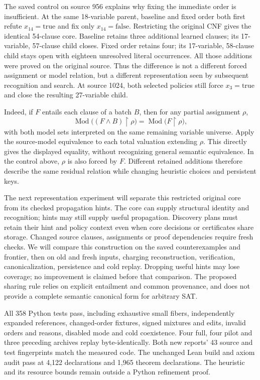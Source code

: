 \documentclass[11pt,a4paper]{article}
\numberwithin{equation}{section}
\newcommand{\restr}{\mathbin{\upharpoonright}}
\theoremstyle{plain}
\theoremstyle{definition}
\theoremstyle{remark}
\begin{document}
The saved control on source 956 explains why fixing the immediate order is insufficient. At the same 18-variable parent, baseline and fixed order both first refute $x_{14}=\mathrm{true}$ and fix only $x_{14}=\mathrm{false}$. Restricting the original CNF gives the identical 54-clause core. Baseline retains three additional learned clauses; its 17-variable, 57-clause child closes. Fixed order retains four; its 17-variable, 58-clause child stays open with eighteen unresolved literal occurrences. All those additions were proved on the original source. Thus the difference is not a different forced assignment or model relation, but a different representation seen by subsequent recognition and search. At source 1024, both selected policies still force $x_3=\mathrm{true}$ and close the resulting 27-variable child.

Indeed, if $F$ entails each clause of a batch $B$, then for any partial assignment $\rho$,
\[
\operatorname{Mod}\bigl((F\land B)\restr\rho\bigr)
=\operatorname{Mod}\bigl(F\restr\rho\bigr),
\]
with both model sets interpreted on the same remaining variable universe. Apply the source-model equivalence to each total valuation extending $\rho$. This directly gives the displayed equality, without recognizing general semantic equivalence. In the control above, $\rho$ is also forced by $F$. Different retained additions therefore describe the same residual relation while changing heuristic choices and persistent keys.

The next representation experiment will separate this restricted original core from its checked propagation hints. The core can supply structural identity and recognition; hints may still supply useful propagation. Discovery plans must retain their hint and policy context even when core decisions or certificates share storage. Changed source clauses, assignments or proof dependencies require fresh checks. We will compare this construction on the saved counterexamples and frontier, then on old and fresh inputs, charging reconstruction, verification, canonicalization, persistence and cold replay. Dropping useful hints may lose coverage; no improvement is claimed before that comparison. The proposed sharing rule relies on explicit entailment and common provenance, and does not provide a complete semantic canonical form for arbitrary SAT.

All 358 Python tests pass, including exhaustive small fibers, independently expanded references, changed-order fixtures, signed mixtures and edits, invalid orders and reasons, disabled mode and cold coexistence. Four full, four pilot and three preceding archives replay byte-identically. Both new reports' 43 source and test fingerprints match the measured code. The unchanged Lean build and axiom audit pass at 4,122 declarations and 1,965 theorem declarations. The heuristic and its resource bounds remain outside a Python refinement proof.
\end{document}
